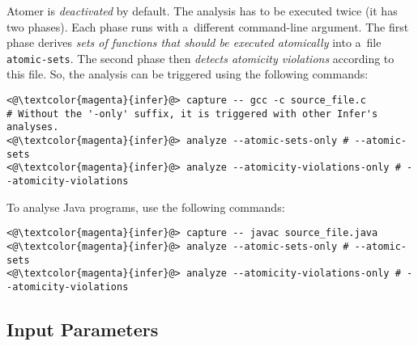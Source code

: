 Atomer is \emph{deactivated} by default. The analysis has to be executed twice (it has two phases). Each phase runs with a~different command-line argument. The first phase derives \emph{sets of functions that should be executed atomically} into a~file \texttt{atomic-sets}. The second phase then \emph{detects atomicity violations} according to this file. So, the analysis can be triggered using the following commands:
\begin{lstlisting}[style=bash]
<@\textcolor{magenta}{infer}@> capture -- gcc -c source_file.c
# Without the '-only' suffix, it is triggered with other Infer's analyses.
<@\textcolor{magenta}{infer}@> analyze --atomic-sets-only # --atomic-sets
<@\textcolor{magenta}{infer}@> analyze --atomicity-violations-only # --atomicity-violations
\end{lstlisting}
To analyse Java programs, use the following commands:
\begin{lstlisting}[style=bash]
<@\textcolor{magenta}{infer}@> capture -- javac source_file.java
<@\textcolor{magenta}{infer}@> analyze --atomic-sets-only # --atomic-sets
<@\textcolor{magenta}{infer}@> analyze --atomicity-violations-only # --atomicity-violations
\end{lstlisting}

\subsection*{Input Parameters}

